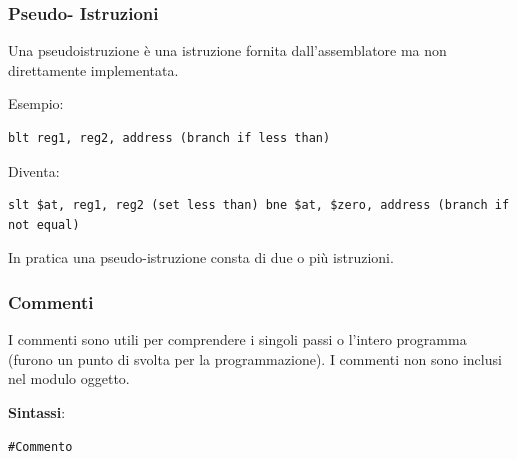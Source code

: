 \documentclass[12pt]{article} %
\begin{document}
\subsubsection{Pseudo- Istruzioni}
Una pseudoistruzione è una istruzione fornita dall’assemblatore ma non direttamente implementata. \par\medskip\noindent Esempio: 
\begin{lstlisting}
blt reg1, reg2, address (branch if less than) 
\end{lstlisting}
\vspace{\baselineskip}
Diventa:
\begin{lstlisting}
slt $at, reg1, reg2 (set less than) bne $at, $zero, address (branch if not equal)
\end{lstlisting}
In pratica una pseudo-istruzione consta di due o più istruzioni.\par\medskip\noindent
\subsubsection{Commenti}
I commenti sono utili per comprendere i singoli passi o l’intero programma (furono un punto di svolta per la programmazione). I commenti non sono inclusi nel modulo oggetto.\par\medskip\noindent
\textbf{Sintassi}: \begin{lstlisting}
#Commento
\end{lstlisting}
\newpage
\end{document}
